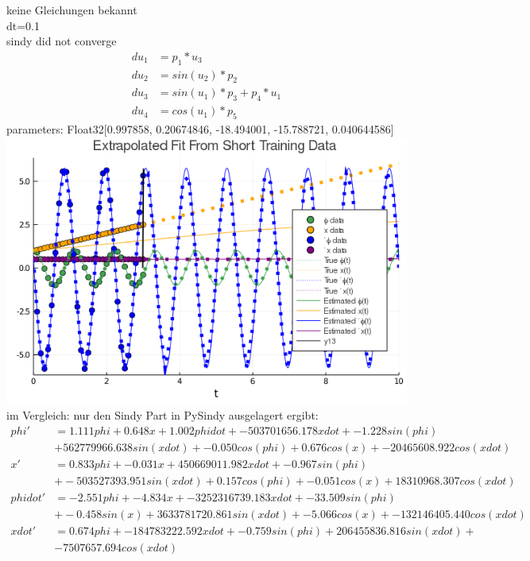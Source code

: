 \documentclass[arbeit=studie,oneside,BCOR=12mm]{ArbeitRST}
\begin{document}
keine Gleichungen bekannt\\
dt=0.1\\
sindy did not converge
\begin{align}
du_1 &= p_1 * u_3\\
du_2 &= sin(u_2) * p_2\\
du_3 &= sin(u_1) * p_3 + p_4 * u_1\\
du_4 &= cos(u_1) * p_5
\end{align}
parameters: Float32[0.997858, 0.20674846, -18.494001, -15.788721, 0.040644586]\\
\includegraphics[width=1\textwidth]{images/ude_ident_without_prior_knowledge}
im Vergleich: nur den Sindy Part in PySindy ausgelagert ergibt:
\begin{align*}
phi' &= 1.111 phi + 0.648 x + 1.002 phidot + -503701656.178 xdot + -1.228 sin(phi) \\&+ 562779966.638 sin(xdot) + -0.050 cos(phi) + 0.676 cos(x) + -20465608.922 cos(xdot)\\
x' &= 0.833 phi + -0.031 x + 450669011.982 xdot + -0.967 sin(phi) \\&+ -503527393.951 sin(xdot) + 0.157 cos(phi) + -0.051 cos(x) + 18310968.307 cos(xdot)\\
phidot' &= -2.551 phi + -4.834 x + -3252316739.183 xdot + -33.509 sin(phi) \\&+ -0.458 sin(x) + 3633781720.861 sin(xdot) + -5.066 cos(x) + -132146405.440 cos(xdot)\\
xdot' &= 0.674 phi + -184783222.592 xdot + -0.759 sin(phi) + 206455836.816 sin(xdot) + \\&-7507657.694 cos(xdot)
\end{align*}
\end{document}

